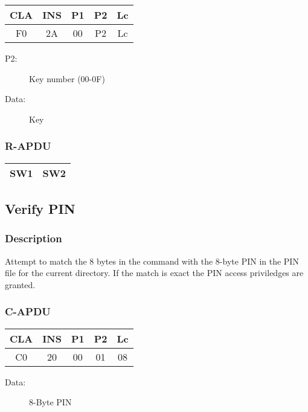 \documentclass[a4paper,oneside]{article}
\begin{document}
\begin{tabular}{|c|c|c|c|c|} \hline
CLA & INS & P1 & P2 & Lc \\ \hline \hline
F0 & 2A & 00 & P2 & Lc \\ \hline
\end{tabular}

\begin{description}
\item[P2:] Key number (00-0F)
\item[Data:] Key
\end{description}

\subsubsection*{R-APDU}

\begin{tabular}{|c|c|} \hline
SW1 & SW2 \\ \hline
\end{tabular}


\subsection{Verify PIN}

\subsubsection*{Description}

Attempt to match the 8 bytes in the command with the 8-byte PIN
in the PIN file for the current directory. If the match is exact
the PIN access priviledges are granted.

\subsubsection*{C-APDU}

\begin{tabular}{|c|c|c|c|c|} \hline
CLA & INS & P1 & P2 & Lc \\ \hline \hline
C0 & 20 & 00 & 01 & 08 \\ \hline
\end{tabular}

\begin{description}
\item[Data:] 8-Byte PIN
\end{description}
\end{document}
